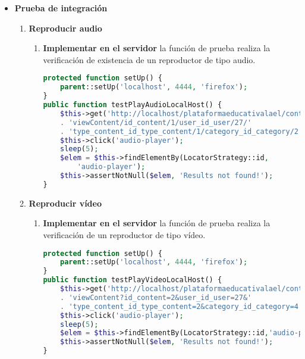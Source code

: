 \begin{itemize}
\begin{enumerate}
\end{enumerate}

\item \textbf{Prueba de integración}

\begin{enumerate}

\item \textbf{Reproducir audio}

\begin{enumerate}

\item \textbf{Implementar en el servidor} la función de prueba
 realiza la verificación de existencia
de un reproductor de tipo audio.

\begin{lstlisting}[language=PHP, caption={Prueba para reproducir reproductor de audio.}]
protected function setUp() {
    parent::setUp('localhost', 4444, 'firefox');
}
public function testPlayAudioLocalHost() {
    $this->get('http://localhost/plataformaeducativalael/content/'
    . 'viewContent/id_content/1/user_id_user/27/'
    . 'type_content_id_type_content/1/category_id_category/2');
    $this->click('audio-player');
    sleep(5);
    $elem = $this->findElementBy(LocatorStrategy::id,
        'audio-player');
    $this->assertNotNull($elem, 'Results not found!');
} 
\end{lstlisting}

\end{enumerate}

\item \textbf{Reproducir vídeo}

\begin{enumerate}

\item \textbf{Implementar en el servidor} la función de prueba
 realiza la verificación de un reproductor
de tipo vídeo.

\begin{lstlisting}[language=PHP, caption={Prueba para reproducir reproductor de vídeo.}]
protected function setUp() {
    parent::setUp('localhost', 4444, 'firefox');
}
public function testPlayVideoLocalHost() {
    $this->get('http://localhost/plataformaeducativalael/content/'
    . 'viewContent?id_content=2&user_id_user=27&'
    . 'type_content_id_type_content=2&category_id_category=4');
    $this->click('audio-player');
    sleep(5);
    $elem = $this->findElementBy(LocatorStrategy::id,'audio-player');
    $this->assertNotNull($elem, 'Results not found!');
}
\end{lstlisting}

\end{enumerate}

\end{enumerate}

\end{itemize}

